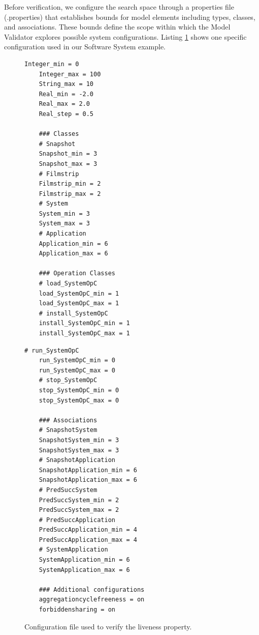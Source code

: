Before verification, we configure the search space through a properties file 
(.properties) that establishes bounds for model elements including types, classes, 
and associations. These bounds define the scope within which the Model Validator 
explores possible system configurations. Listing \ref{lst:configuration_file} shows 
one specific configuration used in our Software System example.

\begin{figure}[htb]
    \begin{minipage}[t]{0.48\textwidth}
    \begin{lstlisting}[basicstyle=\ttfamily\scriptsize, frame=single]
    Integer_min = 0
    Integer_max = 100
    String_max = 10
    Real_min = -2.0
    Real_max = 2.0
    Real_step = 0.5
    
    ### Classes
    # Snapshot
    Snapshot_min = 3
    Snapshot_max = 3
    # Filmstrip
    Filmstrip_min = 2
    Filmstrip_max = 2
    # System
    System_min = 3
    System_max = 3
    # Application
    Application_min = 6
    Application_max = 6
    
    ### Operation Classes
    # load_SystemOpC
    load_SystemOpC_min = 1
    load_SystemOpC_max = 1
    # install_SystemOpC
    install_SystemOpC_min = 1
    install_SystemOpC_max = 1
    \end{lstlisting}
    \end{minipage}
    \hfill
    \begin{minipage}[t]{0.48\textwidth}
    \begin{lstlisting}[basicstyle=\ttfamily\scriptsize, frame=single]
    # run_SystemOpC
    run_SystemOpC_min = 0
    run_SystemOpC_max = 0
    # stop_SystemOpC
    stop_SystemOpC_min = 0
    stop_SystemOpC_max = 0
    
    ### Associations
    # SnapshotSystem
    SnapshotSystem_min = 3
    SnapshotSystem_max = 3
    # SnapshotApplication
    SnapshotApplication_min = 6
    SnapshotApplication_max = 6
    # PredSuccSystem
    PredSuccSystem_min = 2
    PredSuccSystem_max = 2
    # PredSuccApplication
    PredSuccApplication_min = 4
    PredSuccApplication_max = 4
    # SystemApplication
    SystemApplication_min = 6
    SystemApplication_max = 6
    
    ### Additional configurations
    aggregationcyclefreeness = on
    forbiddensharing = on
    \end{lstlisting}
    \end{minipage}
    \caption{Configuration file used to verify the liveness property.}
    \label{lst:configuration_file}
\end{figure}

